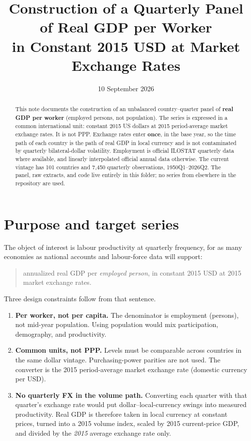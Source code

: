 \documentclass[11pt]{article}
\title{Construction of a Quarterly Panel of Real GDP per Worker\\
in Constant 2015 USD at Market Exchange Rates}
\author{}
\date{10 September 2026}
\begin{document}
\maketitle

\begin{abstract}
\noindent
This note documents the construction of an unbalanced country--quarter panel of
\textbf{real GDP per worker} (employed persons, not population). The series is
expressed in a common international unit: constant 2015 US dollars at 2015
period-average market exchange rates. It is not PPP. Exchange rates enter
\textbf{once}, in the base year, so the time path of each country is the path of
real GDP in local currency and is not contaminated by quarterly bilateral-dollar
volatility. Employment is official ILOSTAT quarterly data where available, and
linearly interpolated official annual data otherwise. The current vintage has
101 countries and 7{,}450 quarterly observations, 1950Q1--2026Q2. The panel,
raw extracts, and code live entirely in this folder; no series from
elsewhere in the repository are used.
\end{abstract}

\tableofcontents
\clearpage

\section{Purpose and target series}

The object of interest is labour productivity at quarterly frequency, for as
many economies as national accounts and labour-force data will support:

\begin{quote}
annualized real GDP per \emph{employed person}, in constant 2015 USD at 2015
market exchange rates.
\end{quote}

Three design constraints follow from that sentence.

\begin{enumerate}
\item \textbf{Per worker, not per capita.} The denominator is employment
(persons), not mid-year population. Using population would mix participation,
demography, and productivity.
\item \textbf{Common units, not PPP.} Levels must be comparable across
countries in the same dollar vintage. Purchasing-power parities are not used.
The converter is the 2015 period-average market exchange rate (domestic
currency per USD).
\item \textbf{No quarterly FX in the volume path.} Converting each quarter with
that quarter's exchange rate would put dollar--local-currency swings into
measured productivity. Real GDP is therefore taken in local currency at
constant prices, turned into a 2015 volume index, scaled by 2015 current-price
GDP, and divided by the \emph{2015} average exchange rate only.
\end{enumerate}
\end{document}
